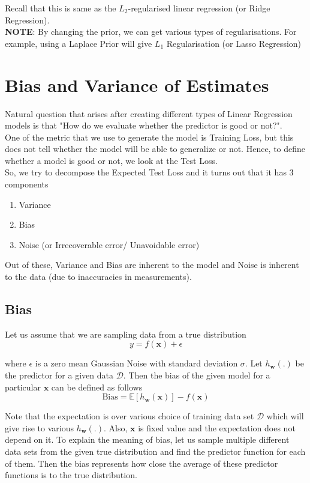 \documentclass{report}
\newcommand{\w}{\mathbf{w}} %
\newcommand{\x}{\mathbf{x}}
\newcommand{\D}{\mathcal{D}}
\begin{document}
Recall that this is same as the $L_2$-regularised linear regression (or Ridge Regression).\\

\textbf{NOTE}: By changing the prior, we can get various types of regularisations. For example, using a Laplace Prior will give \(L_1\) Regularisation (or Lasso Regression)

\section{Bias and Variance of Estimates}
Natural question that arises after creating different types of Linear Regression models is that "How do we evaluate whether the predictor is good or not?". \\

One of the metric that we use to generate the model is Training Loss, but this does not tell whether the model will be able to generalize or not. Hence, to define whether a model is good or not, we look at the Test Loss. \\

So, we try to decompose the Expected Test Loss and it turns out that it has 3 components
\begin{enumerate}
  \itemsep-0.3em
  \item Variance
  \item Bias
  \item Noise (or Irrecoverable error/ Unavoidable error)
\end{enumerate}

Out of these, Variance and Bias are inherent to the model and Noise is inherent to the data (due to inaccuracies in measurements).

\subsection{Bias}

Let us assume that we are sampling data from a true distribution
$$
  y = f(\x) + \epsilon
$$

where $\epsilon$ is a zero mean Gaussian Noise with standard deviation $\sigma$. Let $h_{\w}(.)$ be the predictor for a given data $\D$. Then the bias of the given model for a particular $\x$ can be defined as follows
$$
  \text{Bias} = \mathbb{E}\left[h_\w(\x)\right] - f(\x)
$$

Note that the expectation is over various choice of training data set $\D$ which will give rise to various $h_\w(.)$. Also, $\x$ is fixed value and the expectation does not depend on it.
To explain the meaning of bias, let us sample multiple different data sets from the given true distribution and find the predictor function for each of them. Then the bias represents how close the average of these predictor functions is to the true distribution.
\end{document}

